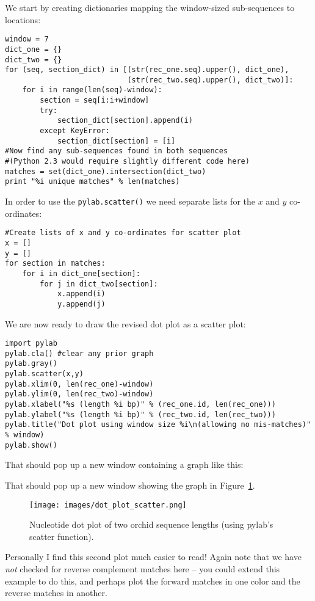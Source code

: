 \documentclass{report}
\begin{document}
We start by creating dictionaries mapping the window-sized sub-sequences to locations:
\begin{verbatim}
window = 7
dict_one = {}
dict_two = {}
for (seq, section_dict) in [(str(rec_one.seq).upper(), dict_one),
                            (str(rec_two.seq).upper(), dict_two)]:
    for i in range(len(seq)-window):
        section = seq[i:i+window]
        try:
            section_dict[section].append(i)
        except KeyError:
            section_dict[section] = [i]
#Now find any sub-sequences found in both sequences
#(Python 2.3 would require slightly different code here)
matches = set(dict_one).intersection(dict_two)
print "%i unique matches" % len(matches)
\end{verbatim}
\noindent In order to use the \verb|pylab.scatter()| we need separate lists for the $x$ and $y$ co-ordinates:
\begin{verbatim}
#Create lists of x and y co-ordinates for scatter plot
x = []
y = []
for section in matches:
    for i in dict_one[section]:
        for j in dict_two[section]:
            x.append(i)
            y.append(j)
\end{verbatim}
\noindent We are now ready to draw the revised dot plot as a scatter plot:
\begin{verbatim}
import pylab
pylab.cla() #clear any prior graph
pylab.gray()
pylab.scatter(x,y)
pylab.xlim(0, len(rec_one)-window)
pylab.ylim(0, len(rec_two)-window)
pylab.xlabel("%s (length %i bp)" % (rec_one.id, len(rec_one)))
pylab.ylabel("%s (length %i bp)" % (rec_two.id, len(rec_two)))
pylab.title("Dot plot using window size %i\n(allowing no mis-matches)" % window)
pylab.show()
\end{verbatim}
%
%
\begin{htmlonly}
\noindent That should pop up a new window containing a graph like this:


\end{htmlonly}
\begin{latexonly}
\noindent That should pop up a new window showing the graph in Figure~\ref{fig:nuc-dot-plot-scatter}.
\begin{figure}[htbp]
\centering
\texttt{[image: images/dot\_plot\_scatter.png]}
\caption{Nucleotide dot plot of two orchid sequence lengths (using pylab's scatter function).}
\label{fig:nuc-dot-plot-scatter}
\end{figure}\end{latexonly}
Personally I find this second plot much easier to read!
Again note that we have \emph{not} checked for reverse complement matches here
-- you could extend this example to do this, and perhaps plot the forward
matches in one color and the reverse matches in another.
\end{document}
